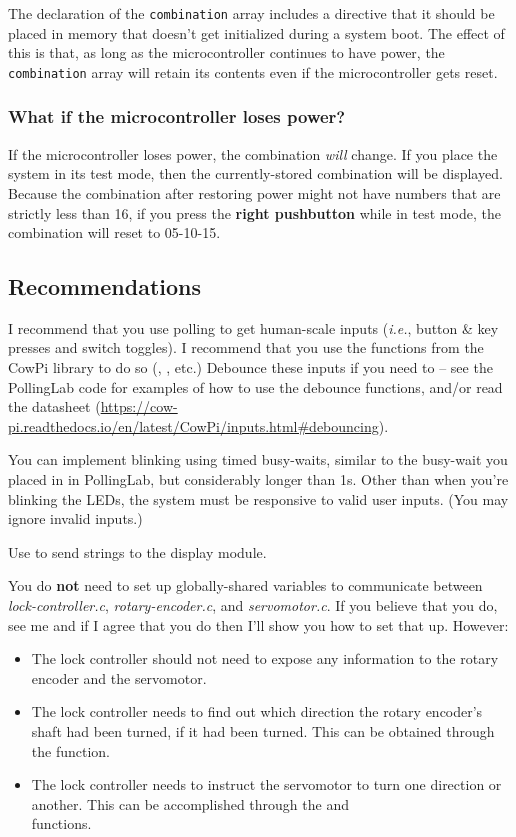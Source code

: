 The declaration of the \lstinline{combination} array includes a directive that it should be placed in memory that doesn't get initialized during a system boot.
The effect of this is that, as long as the microcontroller continues to have power, the \lstinline{combination} array will retain its contents even if the microcontroller gets reset.

\subsubsection*{What if the microcontroller loses power?}

If the microcontroller loses power, the combination \textit{will} change.
If you place the system in its test mode, then the currently-stored combination will be displayed.
Because the combination after restoring power might not have numbers that are strictly less than 16,
if you press the \textbf{right pushbutton} while in test mode, the combination will reset to 05-10-15.


\subsection{Recommendations}

I recommend that you use polling to get human-scale inputs (\textit{i.e.}, button \& key presses and switch toggles).
I recommend that you use the functions from the CowPi library to do so (, , etc.)
Debounce these inputs if you need to -- see the PollingLab code for examples of how to use the debounce functions, and/or read the datasheet (\url{https://cow-pi.readthedocs.io/en/latest/CowPi/inputs.html#debouncing}).

You can implement blinking using timed busy-waits, similar to the busy-wait you placed in  in PollingLab, but considerably longer than 1\textmu s.
Other than when you're blinking the LEDs, the system must be responsive to valid user inputs.
(You may ignore invalid inputs.)

Use  to send strings to the display module.

You do \textbf{not} need to set up globally-shared variables to communicate between \textit{lock-controller.c}, \textit{rotary-encoder.c}, and \textit{servomotor.c}.
If you believe that you do, see me and if I agree that you do then I'll show you how to set that up.
However:
\begin{itemize}
    \item The lock controller should not need to expose any information to the rotary encoder and the servomotor.
    \item The lock controller needs to find out which direction the rotary encoder's shaft had been turned, if it had been turned.
        This can be obtained through the  function.
    \item The lock controller needs to instruct the servomotor to turn one direction or another.
        This can be accomplished through the  and \\  functions.
\end{itemize}
